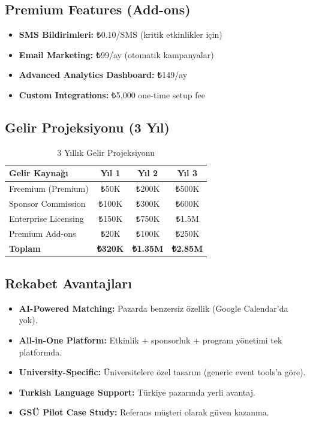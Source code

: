 \documentclass[a4paper,12pt]{report}
\begin{document}
\subsection{Premium Features (Add-ons)}

\begin{itemize}
    \item \textbf{SMS Bildirimleri:} ₺0.10/SMS (kritik etkinlikler için)
    \item \textbf{Email Marketing:} ₺99/ay (otomatik kampanyalar)
    \item \textbf{Advanced Analytics Dashboard:} ₺149/ay
    \item \textbf{Custom Integrations:} ₺5,000 one-time setup fee
\end{itemize}

\subsection{Gelir Projeksiyonu (3 Yıl)}

\begin{table}[h]
\centering
\small
\begin{tabular}{|l|c|c|c|}
\hline
\textbf{Gelir Kaynağı} & \textbf{Yıl 1} & \textbf{Yıl 2} & \textbf{Yıl 3} \\ \hline
Freemium (Premium) & ₺50K & ₺200K & ₺500K \\ \hline
Sponsor Commission & ₺100K & ₺300K & ₺600K \\ \hline
Enterprise Licensing & ₺150K & ₺750K & ₺1.5M \\ \hline
Premium Add-ons & ₺20K & ₺100K & ₺250K \\ \hline
\textbf{Toplam} & \textbf{₺320K} & \textbf{₺1.35M} & \textbf{₺2.85M} \\ \hline
\end{tabular}
\caption{3 Yıllık Gelir Projeksiyonu}
\end{table}

\subsection{Rekabet Avantajları}

\begin{itemize}
    \item \textbf{AI-Powered Matching:} Pazarda benzersiz özellik (Google Calendar'da yok).
    \item \textbf{All-in-One Platform:} Etkinlik + sponsorluk + program yönetimi tek platformda.
    \item \textbf{University-Specific:} Üniversitelere özel tasarım (generic event tools'a göre).
    \item \textbf{Turkish Language Support:} Türkiye pazarında yerli avantaj.
    \item \textbf{GSÜ Pilot Case Study:} Referans müşteri olarak güven kazanma.
\end{itemize}
\end{document}
